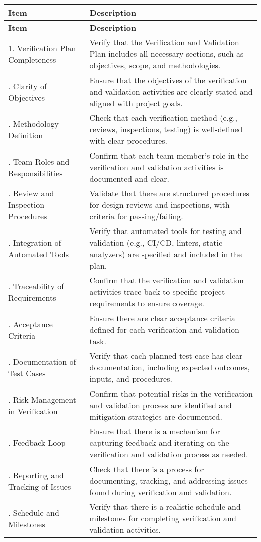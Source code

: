 \documentclass[12pt, titlepage]{article}
\begin{document}
\begin{center}
  \begin{longtable}{|>{\centering\arraybackslash}p{4cm}|p{10cm}|}
  \hline
  \textbf{Item} & \textbf{Description} \\
  \hline
  \endfirsthead
  
  \hline
  \textbf{Item} & \textbf{Description} \\
  \hline
  \endhead
  
  1. Verification Plan Completeness & Verify that the Verification and Validation Plan includes all necessary sections, such as objectives, scope, and methodologies. \\
  \hline
  2. Clarity of Objectives & Ensure that the objectives of the verification and validation activities are clearly stated and aligned with project goals. \\
  \hline
  3. Methodology Definition & Check that each verification method (e.g., reviews, inspections, testing) is well-defined with clear procedures. \\
  \hline
  4. Team Roles and Responsibilities & Confirm that each team member's role in the verification and validation activities is documented and clear. \\
  \hline
  5. Review and Inspection Procedures & Validate that there are structured procedures for design reviews and inspections, with criteria for passing/failing. \\
  \hline
  6. Integration of Automated Tools & Verify that automated tools for testing and validation (e.g., CI/CD, linters, static analyzers) are specified and included in the plan. \\
  \hline
  7. Traceability of Requirements & Confirm that the verification and validation activities trace back to specific project requirements to ensure coverage. \\
  \hline
  8. Acceptance Criteria & Ensure there are clear acceptance criteria defined for each verification and validation task. \\
  \hline
  9. Documentation of Test Cases & Verify that each planned test case has clear documentation, including expected outcomes, inputs, and procedures. \\
  \hline
  10. Risk Management in Verification & Confirm that potential risks in the verification and validation process are identified and mitigation strategies are documented. \\
  \hline
  11. Feedback Loop & Ensure that there is a mechanism for capturing feedback and iterating on the verification and validation process as needed. \\
  \hline
  12. Reporting and Tracking of Issues & Check that there is a process for documenting, tracking, and addressing issues found during verification and validation. \\
  \hline
  13. Schedule and Milestones & Verify that there is a realistic schedule and milestones for completing verification and validation activities. \\
  \hline
  
  \end{longtable}
  \end{center}
\end{document}
